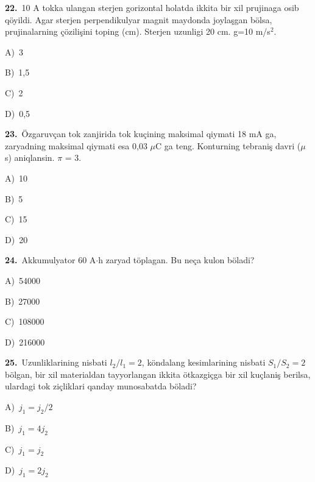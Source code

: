 \documentclass[11pt,a4paper]{article}
\newcommand{\opt}[2]{\hspace*{4mm}#1)\ #2\par}
\begin{document}
\noindent\begin{minipage}{\linewidth}
\textbf{22.}\ 10 A tokka ulangan sterjen gorizontal holatda ikkita bir xil prujinaga osib qöyildi. Agar sterjen perpendikulyar magnit maydonda joylaşgan bölsa, prujinalarning çözilişini toping (cm). Sterjen uzunligi 20 cm. g=10 m/s$^{2}$.\par\smallskip
\noindent\hspace*{4mm}\par\smallskip
\opt{A}{3}
\opt{B}{1,5}
\opt{C}{2}
\opt{D}{0,5}
\end{minipage}\vspace{9pt}\par
\noindent\begin{minipage}{\linewidth}
\textbf{23.}\ Özgaruvçan tok zanjirida tok kuçining maksimal qiymati 18 mA ga, zaryadning maksimal qiymati esa 0,03 $\mu$C ga teng. Konturning tebraniş davri ($\mu$s) aniqlansin. $\pi$ = 3.\par\smallskip
\opt{A}{10}
\opt{B}{5}
\opt{C}{15}
\opt{D}{20}
\end{minipage}\vspace{9pt}\par
\noindent\begin{minipage}{\linewidth}
\textbf{24.}\ Akkumulyator 60 A$\cdot$h zaryad töplagan. Bu neça kulon böladi?\par\smallskip
\opt{A}{54000}
\opt{B}{27000}
\opt{C}{108000}
\opt{D}{216000}
\end{minipage}\vspace{9pt}\par
\noindent\begin{minipage}{\linewidth}
\textbf{25.}\ Uzunliklarining nisbati $l_2/l_1=2$, köndalang kesimlarining nisbati $S_1/S_2=2$ bölgan, bir xil materialdan tayyorlangan ikkita ötkazgiçga bir xil kuçlaniş berilsa, ulardagi tok ziçliklari qanday munosabatda böladi?\par\smallskip
\opt{A}{$j_1=j_2/2$}
\opt{B}{$j_1=4j_2$}
\opt{C}{$j_1=j_2$}
\opt{D}{$j_1=2j_2$}
\end{minipage}\vspace{9pt}\par
\end{document}
